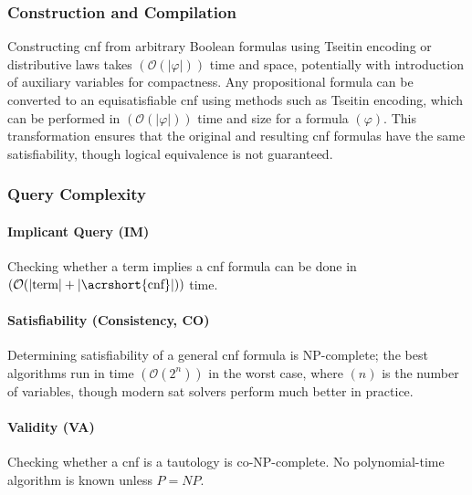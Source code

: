 \subsubsection{Construction and Compilation}
Constructing \acrshort{cnf} from arbitrary Boolean formulas using Tseitin encoding or distributive laws takes $(\mathcal{O}(|\varphi|))$ time and space, potentially with introduction of auxiliary variables for compactness. Any propositional formula can be converted to an equisatisfiable \acrshort{cnf} using methods such as Tseitin encoding, which can be performed in $(\mathcal{O}(|\varphi|))$ time and size for a formula $(\varphi)$. This transformation ensures that the original and resulting \acrshort{cnf} formulas have the same satisfiability, though logical equivalence is not guaranteed.

\subsubsection{Query Complexity}

\paragraph{Implicant Query (IM)}
Checking whether a term implies a \acrshort{cnf} formula can be done in $(\mathcal{O}(|\text{term}| + |\text{\acrshort{cnf}}|))$ time.

\paragraph{Satisfiability (Consistency, CO)}
Determining satisfiability of a general \acrshort{cnf} formula is NP-complete; the best algorithms run in time $(\mathcal{O}(2^n))$ in the worst case, where $(n)$ is the number of variables, though modern \acrshort{sat} solvers perform much better in practice.

\paragraph{Validity (VA)}
Checking whether a \acrshort{cnf} is a tautology is co-NP-complete. No polynomial-time algorithm is known unless $P = NP$.

